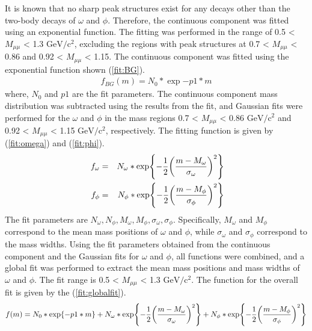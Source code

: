                 It is known that no sharp peak structures exist for any decays other than the two-body decays of \(\omega\) and \(\phi\). Therefore, the continuous component was fitted using an exponential function. The fitting was performed in the range of 0.5 < \(M_{\mu\mu}\) < 1.3 \(\mathrm{GeV/c^2}\), excluding the regions with peak structures at 0.7 < \(M_{\mu\mu}\) < 0.86 and 0.92 < \(M_{\mu\mu}\) < 1.15. The continuous component was fitted using the exponential function shown (\ref{fit:BG}).
                \begin{eqnarray}
                    \label{fit:BG}
                    f_{BG}(m)=N_0*\exp{-p1* m}
                \end{eqnarray}
                where, \(N_0\) and \(p1\) are the fit parameters. The continuous component mass distribution was subtracted using the results from the fit, and Gaussian fits were performed for the \(\omega\) and \(\phi\) in the mass regions 0.7 < \(M_{\mu\mu}\) < 0.86 \(\mathrm{GeV/c^2}\) and 0.92 < \(M_{\mu\mu}\) < 1.15 \(\mathrm{GeV/c^2}\), respectively. The fitting function is given by (\ref{fit:omega}) and (\ref{fit:phi}).
                \begin{eqnarray}
                    \label{fit:omega}
                    f_{\omega} &=& N_{\omega}*\exp{-\frac{1}{2}\qty(\frac{m-M_{\omega}}{\sigma_{\omega}})^2}\\\
                    \label{fit:phi}
                    f_{\phi} &=& N_{\phi}*\exp{-\frac{1}{2}\qty(\frac{m-M_{\phi}}{\sigma_{\phi}})^2}
                \end{eqnarray}
                The fit parameters are \(N_{\omega}, N_{\phi}, M_{\omega}, M_{\phi}, \sigma_{\omega}, \sigma_{\phi}\). Specifically, \(M_{\omega}\) and \(M_{\phi}\) correspond to the mean mass positions of \(\omega\) and \(\phi\), while \(\sigma_{\omega}\) and \(\sigma_{\phi}\) correspond to the mass widths. Using the fit parameters obtained from the continuous component and the Gaussian fits for \(\omega\) and \(\phi\), all functions were combined, and a global fit was performed to extract the mean mass positions and mass widths of \(\omega\) and \(\phi\). The fit range is 0.5 < \(M_{\mu\mu}\) < 1.3 \(\mathrm{GeV/c^2}\). The function for the overall fit is given by the (\ref{fit:globalfit}).
                \begin{eqnarray}
                    \label{fit:globalfit}
                    f(m)=N_0*\exp{-p1* m}+N_{\omega}*\exp{-\frac{1}{2}\qty(\frac{m-M_{\omega}}{\sigma_{\omega}})^2}+N_{\phi}*\exp{-\frac{1}{2}\qty(\frac{m-M_{\phi}}{\sigma_{\phi}})^2}
                \end{eqnarray}
